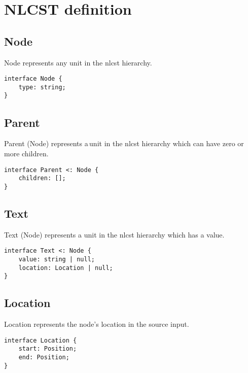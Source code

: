 
\chapter{NLCST definition}\label{appendix-nlcst}

\section*{Node}\label{node}

Node represents any unit in the \gls{nlcst} hierarchy.

\begin{lstlisting}
interface Node {
    type: string;
}
\end{lstlisting}

\section*{Parent}\label{parent}

Parent (Node) represents a\,unit in the \gls{nlcst} hierarchy which can have
  zero or more children.

\begin{lstlisting}
interface Parent <: Node {
    children: [];
}
\end{lstlisting}

\section*{Text}\label{text}

Text (Node) represents a unit in the \gls{nlcst} hierarchy which has a
  value.

\begin{lstlisting}
interface Text <: Node {
    value: string | null;
    location: Location | null;
}
\end{lstlisting}

\section*{Location}\label{location}

Location represents the node's location in the source input.

\begin{lstlisting}
interface Location {
    start: Position;
    end: Position;
}
\end{lstlisting}


